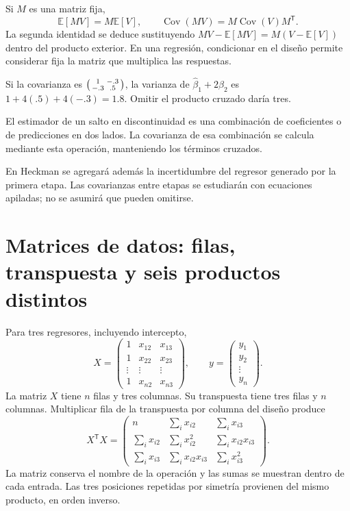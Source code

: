 \documentclass[11pt,a4paper]{article}
\newcommand{\E}{\mathbb E}
\newcommand{\T}{^{\mathsf T}}
\DeclareMathOperator{\Cov}{Cov}
\begin{document}
Si \(M\) es una matriz fija,
\[
\E[MV]=M\E[V],\qquad \Cov(MV)=M\Cov(V)M\T.
\]
La segunda identidad se deduce sustituyendo
\(MV-\E[MV]=M(V-\E[V])\) dentro del producto exterior.
En una regresión, condicionar en el diseño permite
considerar fija la matriz que multiplica las respuestas.

\begin{ejemplo}
Si la covarianza es
\(\begin{psmallmatrix}1&-.3\\-.3&.5\end{psmallmatrix}\),
la varianza de \(\widehat\beta_1+2\widehat\beta_2\)
es \(1+4(.5)+4(-.3)=1.8\).
Omitir el producto cruzado daría tres.
\end{ejemplo}
El estimador de un salto en discontinuidad es una
combinación de coeficientes o de predicciones en dos lados.
La covarianza de esa combinación se calcula mediante
esta operación, manteniendo los términos cruzados.

En Heckman se agregará además la incertidumbre
del regresor generado por la primera etapa.
Las covarianzas entre etapas se estudiarán con
ecuaciones apiladas; no se asumirá que pueden omitirse.

\clearpage
\section{Matrices de datos: filas, transpuesta y seis productos distintos}\label{unidad6}
Para tres regresores, incluyendo intercepto,
\[
X=\begin{pmatrix}
1&x_{12}&x_{13}\\
1&x_{22}&x_{23}\\
\vdots&\vdots&\vdots\\
1&x_{n2}&x_{n3}
\end{pmatrix},\qquad
y=\begin{pmatrix}y_1\\y_2\\\vdots\\y_n\end{pmatrix}.
\]
La matriz \(X\) tiene \(n\) filas y tres columnas.
Su transpuesta tiene tres filas y \(n\) columnas.
Multiplicar fila de la transpuesta por columna del diseño produce
\[
X\T X=
\begin{pmatrix}
n&\sum_i x_{i2}&\sum_i x_{i3}\\
\sum_i x_{i2}&\sum_i x_{i2}^2&\sum_i x_{i2}x_{i3}\\
\sum_i x_{i3}&\sum_i x_{i2}x_{i3}&\sum_i x_{i3}^2
\end{pmatrix}.
\]
La matriz conserva el nombre de la operación y
las sumas se muestran dentro de cada entrada.
Las tres posiciones repetidas por simetría
provienen del mismo producto, en orden inverso.
\end{document}

